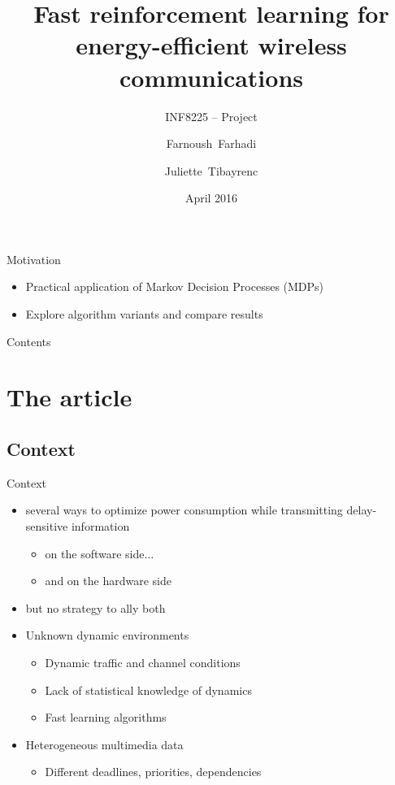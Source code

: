 \documentclass{beamer}
\title{Fast reinforcement learning for energy-efficient wireless communications}
\subtitle{INF8225 – Project}
\author{Farnoush~Farhadi \and Juliette~Tibayrenc}
\institute[Polytechnique Montreal] %
{Polytechnique Montreal}
\date{April 2016}
\begin{document}
\begin{frame}
  \titlepage
\end{frame}

\begin{frame}{Motivation}
\begin{itemize}
\item Practical application of Markov Decision Processes (MDPs)
\item Explore algorithm variants and compare results
\end{itemize}
\end{frame}

\begin{frame}{Contents}
  \tableofcontents
\end{frame}

\section{The article} 
\subsection{Context}
\begin{frame}{Context}
\begin{itemize}
\item several ways to optimize power consumption while transmitting delay-sensitive information
\begin{itemize}
\item on the software side$\dots$
\item and on the hardware side
\end{itemize}
\item but no strategy to ally both
\item Unknown dynamic environments
\begin{itemize}
\item Dynamic traffic and channel conditions
\item Lack of statistical knowledge of dynamics
\item Fast learning algorithms
\end{itemize}
\item Heterogeneous multimedia data
\begin{itemize}
\item Different deadlines, priorities, dependencies
\end{itemize}
\end{itemize}
\end{frame}
\end{document}

